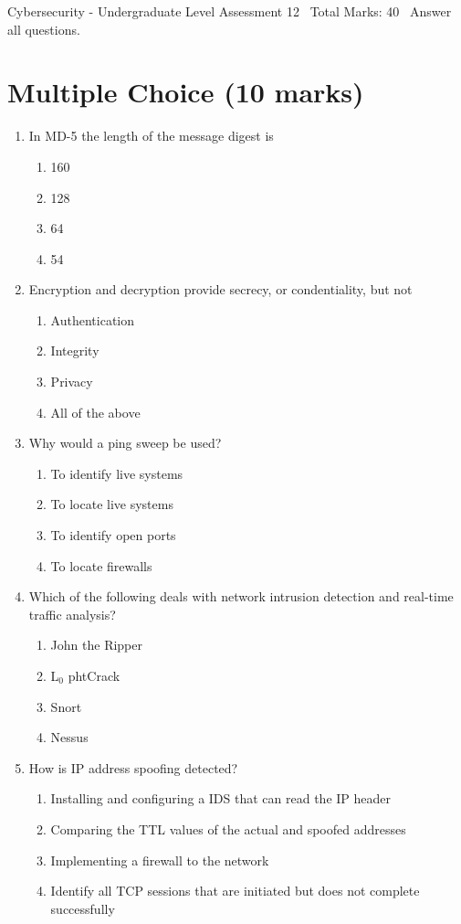 \documentclass[12pt]{article}
\begin{document}
\begin{center}
Cybersecurity - Undergraduate Level Assessment 12 \
Total Marks: 40 \
Answer all questions.
\end{center}

\section*{Multiple Choice (10 marks)}
\begin{enumerate}[label=\arabic*.]
\item In MD-5 the length of the message digest is
\begin{enumerate}[label=(\alph*)]
    \item 160
    \item 128
    \item 64
    \item 54
\end{enumerate}
\item Encryption and decryption provide secrecy, or condentiality, but not
\begin{enumerate}[label=(\alph*)]
    \item Authentication
    \item Integrity
    \item Privacy
    \item All of the above
\end{enumerate}
\item Why would a ping sweep be used?
\begin{enumerate}[label=(\alph*)]
    \item To identify live systems
    \item To locate live systems
    \item To identify open ports
    \item To locate firewalls
\end{enumerate}
\item Which of the following deals with network intrusion detection and real-time traffic analysis?
\begin{enumerate}[label=(\alph*)]
    \item John the Ripper
    \item L$_{0}$ phtCrack
    \item Snort
    \item Nessus
\end{enumerate}
\item How is IP address spoofing detected?
\begin{enumerate}[label=(\alph*)]
    \item Installing and configuring a IDS that can read the IP header
    \item Comparing the TTL values of the actual and spoofed addresses
    \item Implementing a firewall to the network
    \item Identify all TCP sessions that are initiated but does not complete successfully
\end{enumerate}
\end{enumerate}
\end{document}
